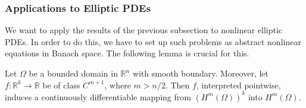 \subsubsection{Applications to Elliptic PDEs}\label{subsec:implicit-function-elliptic-applications}

We want to apply the results of the previous subsection to nonlinear elliptic PDEs. In order to do this, we have to set up such problems as abstract nonlinear equations in Banach space. The following lemma is crucial for this.

\begin{Lemma}
\label{lem:sobolev-pointwise-composition-differentiability}
Let $\Omega$ be a bounded domain in $\mathbb{R}^n$ with smooth boundary. Moreover, let $f:\mathbb{R}^k\to\mathbb{R}$ be of class $C^{m+1}$, where $m>n/2$. Then $f$, interpreted pointwise, induces a continuously differentiable mapping from $(H^m(\Omega))^k$ into $H^m(\Omega)$.
\end{Lemma}

